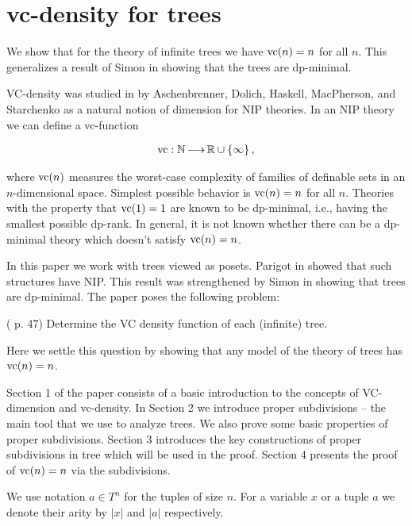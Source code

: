 \chapter{vc-density for trees}


  We show that for the theory of infinite trees we have $\operatorname{vc}(n) = n$ for all $n$.
  This generalizes a result of Simon in \cite{simon_dp_min} showing that the trees are dp-minimal. 


VC-density was studied in \cite{density} by Aschenbrenner, Dolich, Haskell, MacPherson, and Starchenko as a natural notion of dimension for NIP theories. In an NIP theory we can define a vc-function

\begin{align*}
  \operatorname{vc} : \mathbb{N} \operatorname{\longrightarrow} \mathbb{R} \cup \left\{\infty\right\},
\end{align*}

where $\operatorname{vc}(n)$ measures the worst-case complexity of families of definable sets in an $n$-dimensional space. Simplest possible behavior is $\operatorname{vc}(n) = n$ for all $n$. Theories with the property that $\operatorname{vc}(1) = 1$ are known to be dp-minimal, i.e., having the smallest possible dp-rank. In general, it is not known whether there can be a dp-minimal theory which doesn't satisfy $\operatorname{vc}(n)=n$.

In this paper we work with trees viewed as posets.
Parigot in \cite{parigot_trees} showed that such structures have NIP.
This result was strengthened by Simon in \cite{simon_dp_min} showing that trees are dp-minimal.
The paper \cite{density} poses the following problem:

\begin{Problem} (\cite{density} p. 47)
  Determine the VC density function of each (infinite) tree.
\end{Problem}

Here we settle this question by showing that any model of the theory of trees has $\operatorname{vc}(n) = n$.

Section 1 of the paper consists of a basic introduction to the concepts of VC-dimension and vc-density.
In Section 2 we introduce proper subdivisions -- the main tool that we use to analyze trees.
We also prove some basic properties of proper subdivisions.
Section 3 introduces the key constructions of proper subdivisions in tree which will be used in the proof.
Section 4 presents the proof of $\operatorname{vc}(n) = n$ via the subdivisions.

We use notation $a \in T^n$ for the tuples of size $n$. For a variable $x$ or a tuple $a$ we denote their arity by $|x|$ and $|a|$ respectively.

